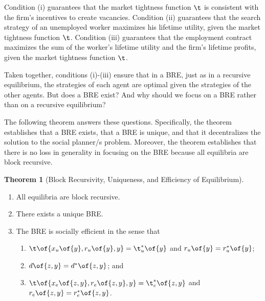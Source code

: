 \documentclass[12pt]{article}
\newcommand{\highlightP}[1]{{\emph{\color{MyPink}{#1}}}}
\theoremstyle{definition}
\newtheorem{theorem}{Theorem}
\begin{document}
Condition (i) guarantees that the market tightness function $\t$ is consistent with the firm's incentives to create vacancies. Condition (ii) guarantees that the search strategy of an unemployed worker maximizes his lifetime utility, given the market tightness function $\t$. Condition (iii) guarantees that the employment contract maximizes the sum of the worker's lifetime utility and the firm's lifetime profits, given the market tightness function $\t$. 

Taken together, conditions (i)-(iii) ensure that in a BRE, just as in a recursive equilibrium, the strategies of each agent are optimal given the strategies of the other agents. \highlightP{However, contrary to a recursive equilibrium, in a BRE, the agent's value and policy functions depend on the aggregate state of the economy, $\psi$, only through the aggregate productivity, $y$, and not through the distribution of workers across different employment states, $(u, g)$.} But does a BRE exist? And why should we focus on a BRE rather than on a recursive equilibrium?

The following theorem answers these questions. Specifically, the theorem establishes that a BRE exists, that a BRE is unique, and that it decentralizes the solution to the social planner/s problem. Moreover, the theorem establishes that there is no loss in generality in focusing on the BRE because all equilibria are block recursive.

\begin{theorem}[Block Recursivity, Uniqueness, and Efficiency of Equilibrium] \label{thm2}
    \begin{enumerate}[topsep=0pt, leftmargin=20pt, itemsep=0pt, label=(\roman*)]
        \setlength{\parskip}{10pt} 
        \item All equilibria are block recursive.
        \item There exists a unique BRE.
        \item The BRE is socially efficient in the sense that
        \begin{enumerate}[topsep=0pt, leftmargin=25pt, itemsep=0pt, label=(\alph*)]
            \setlength{\parskip}{10pt} 
            \item $\t\of{x_u\of{y}, r_u\of{y}, y} = \t_u^*\of{y}$ and $r_u\of{y} = r_u^*\of{y}$;
            \item $d\of{z, y} = d^*\of{z, y}$; and 
            \item $\t\of{x_e\of{z, y}, r_e\of{z, y}, y} = \t_e^*\of{z, y}$ and $r_e\of{z, y} = r_e^*\of{z, y}$.
        \end{enumerate}
    \end{enumerate}
\end{theorem}
\end{document}
